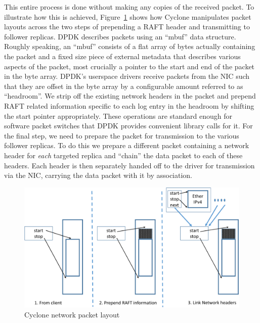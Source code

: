 \documentclass[pageno]{jpaper}
\begin{document}
This entire process is done without making any copies of the received packet.
To illustrate how this is achieved, Figure~\ref{fig:packet_layout} shows how
Cyclone manipulates packet layouts across the two steps of prepending a RAFT
header and transmitting to follower replicas. DPDK describes packets using an
``mbuf'' data structure. Roughly speaking, an ``mbuf'' consists of a flat array
of bytes actually containing the packet and a fixed size piece of external
metadata that describes various aspects of the packet, most crucially a pointer
to the start and end of the packet in the byte array. DPDK's userspace drivers
receive packets from the NIC such that they are offset in the byte array by a
configurable amount referred to as ``headroom''. We strip off the existing
network headers in the packet and prepend RAFT related information specific to
each log entry in the headroom by shifting the start pointer appropriately.
These operations are standard enough for software packet switches that DPDK
provides convenient library calls for it. For the final step, we need to prepare
the packet for transmission to the various follower replicas. To do this we
prepare a different packet containing a network header for \emph{each}
targeted replica and ``chain'' the data packet to each of these headers. Each
header is then separately handed off to the driver for transmission via the NIC,
carrying the data packet with it by association.

\begin{figure}
  \centering
  \includegraphics[scale=0.35]{figures2/network_packet.pdf}
  \caption{Cyclone network packet layout}
  \label{fig:packet_layout}
\end{figure}
\end{document}
